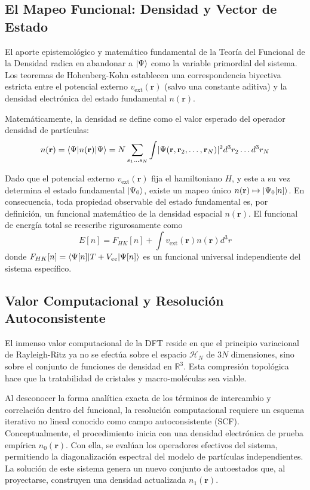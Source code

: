 \documentclass[pdflatex,sn-mathphys-num]{sn-jnl}
\theoremstyle{thmstyleone}%
\theoremstyle{thmstyletwo}%
\theoremstyle{thmstylethree}%
\begin{document}
\subsection{El Mapeo Funcional: Densidad y Vector de Estado} 

El aporte epistemológico y matemático fundamental de la Teoría del Funcional de la
Densidad radica en abandonar a $\ket{\Psi}$ como la variable primordial del
sistema. Los teoremas de Hohenberg-Kohn establecen una correspondencia biyectiva
estricta entre el potencial externo $v_{\text{ext}}(\mathbf{r})$ (salvo una constante
aditiva) y la densidad electrónica del estado fundamental $n(\mathbf{r})$.

Matemáticamente, la densidad se define como el valor esperado del operador
densidad de partículas:
\begin{equation}
    n(\mathbf{r}) = \braket{\Psi | n(\mathbf{r}) | \Psi} = N \sum_{s_1 \dots
    s_N} \int \lvert\Psi(\mathbf{r}, \mathbf{r}_2, \dots, \mathbf{r}_N)\rvert^2
    d^3r_2 \dots d^3r_N
\end{equation}

Dado que el potencial externo $v_{\text{ext}}(\mathbf{r})$ fija el hamiltoniano $H$, y este a su vez determina el estado fundamental $\ket{\Psi_0}$, existe un mapeo único $n(\mathbf{r}) \mapsto \ket{\Psi_0[n]}$. En consecuencia, toda propiedad observable del
estado fundamental es, por definición, un funcional matemático de la densidad
espacial $n(\mathbf{r})$. El funcional de energía total se reescribe
rigurosamente como
\begin{equation}
    E[n] = F_{HK}[n] + \int v_{\text{ext}}(\mathbf{r})n(\mathbf{r}) d^3r
\end{equation}
donde $F_{HK}[n] = \braket{\Psi[n] | T + V_{ee} | \Psi[n]}$ es un funcional universal independiente del sistema específico.

\subsection{Valor Computacional y Resolución Autoconsistente} 

El inmenso valor computacional de la DFT reside en que el principio variacional de Rayleigh-Ritz ya no se efectúa sobre el espacio $\mathcal{H}_N$ de $3N$ dimensiones, sino sobre el conjunto de funciones de densidad en $\mathbb{R}^3$. Esta compresión topológica hace que la tratabilidad de cristales y macro-moléculas sea viable.

Al desconocer la forma analítica exacta de los términos de intercambio y
correlación dentro del funcional, la resolución computacional requiere un
esquema iterativo no lineal conocido como campo autoconsistente (SCF). Conceptualmente, el procedimiento inicia con una densidad electrónica de prueba
empírica $n_{0}(\mathbf{r})$. Con ella, se evalúan los operadores efectivos del
sistema, permitiendo la diagonalización espectral del modelo de partículas
independientes. La solución de este sistema genera un nuevo conjunto de
autoestados que, al proyectarse, construyen una densidad actualizada $n_{1}(\mathbf{r})$.
\end{document}
